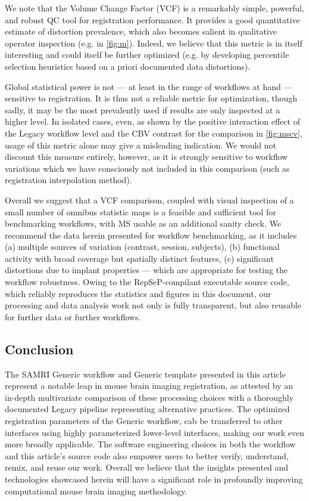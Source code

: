 We note that the Volume Change Factor (VCF) is a remarkably simple, powerful, and robust QC tool for registration performance.
It provides a good quantitative estimate of distortion prevalence, which also becomes salient in qualitative operator inspection (e.g. in \cref{fig:m}).
Indeed, we believe that this metric is in itself interesting and could itself be further optimized (e.g. by developing percentile selection heuristics based on a priori documented data distortions).

Global statistical power is not --- at least in the range of workflows at hand --- sensitive to registration.
It is thus not a reliable metric for optimization, though sadly, it may be the most prevalently used if results are only inspected at a higher level.
In isolated cases, even, as shown by the positive interaction effect of the Legacy workflow level and the CBV contrast for the comparison in \cref{fig:mscv}, usage of this metric alone may give a misleading indication.
We would not discount this measure entirely, however, as it is strongly sensitive to workflow variations which we have consciously not included in this comparison (such as registration interpolation method).

Overall we suggest that a VCF comparison, coupled with visual inspection of a small number of omnibus statistic maps is a feasible and sufficient tool for benchmarking workflows, with MS usable as an additional sanity check.
We recommend the data herein presented for workflow benchmarking, as it includes (a) multiple sources of variation (contrast, session, subjects), (b) functional activity with broad coverage but spatially distinct features, (c) significant distortions due to implant properties --- which are appropriate for testing the workflow robustness.
Owing to the RepSeP-compilant executable source code, which reliably reproduces the statistics and figures in this document, our processing and data analysis work not only is fully transparent, but also reusable for further data or further workflows.

\subsection{Conclusion}

The SAMRI Generic workflow and Generic template presented in this article represent a notable leap in mouse brain imaging registration, as attested by an in-depth multivariate comparison of these processing choices with a thoroughly documented Legacy pipeline representing alternative practices.
The optimized registration parameters of the Generic workflow, cab be transferred to other interfaces using highly parameterized lower-level interfaces, making our work even more broadly applicable.
The software engineering choices in both the workflow and this article's source code also empower users to better verify, understand, remix, and reuse our work.
Overall we believe that the insights presented and technologies showcased herein will have a significant role in profoundly improving computational mouse brain imaging methodology.
